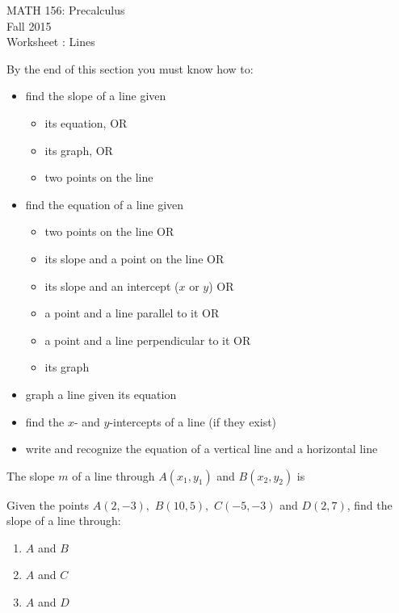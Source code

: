 \documentclass[11pt]{article}
\newcommand{\sect}{\textsection}
\begin{document}
 

\begin{center}MATH 156: Precalculus  \\ Fall 2015 \\ Worksheet \sect 1.10: Lines\end{center}

\hrulefill

By the end of this section you must know how to:
\begin{itemize}
\item find the slope of a line given
\begin{itemize}
\item its equation, OR
\item its graph, OR
\item two points on the line 
\end{itemize}

\item find the equation of a line given

\begin{itemize}
\item two points on the line OR
\item its slope and a point on the line OR
\item its slope and an intercept ($x$ or $y$) OR
\item a point and a line parallel to it OR
\item a point and a line perpendicular to it OR
\item its graph
\end{itemize}

\item graph a line given its equation

\item find the $x$- and $y$-intercepts of a line (if they exist)

\item write and recognize the equation of a vertical line and a horizontal line

\end{itemize}

\hrulefill

{} The slope $m$ of a line through $A(x_1,y_1)$ and $B(x_2,y_2)$ is

\vspace{1in}

{} Given the  points $A(2, -3),$ $B(10, 5),$ $C(-5,-3)$ and $D(2,7)$, find the slope of a line through:
\begin{enumerate}
\item $A$ and $B$
\vfill
\item $A$ and $C$
\vfill
\item $A$ and $D$
\vfill
\end{enumerate}
\end{document}
